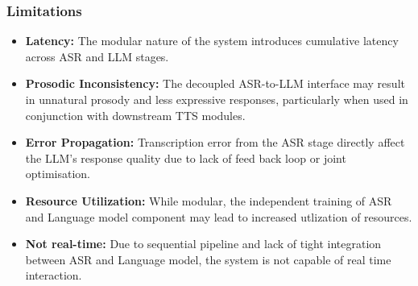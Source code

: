     \subsubsection{Limitations}
    \begin{itemize}
        \item \textbf{Latency: } The modular nature of the system introduces cumulative latency across ASR and LLM stages.
        \item \textbf{Prosodic Inconsistency: } The decoupled ASR-to-LLM interface may result in unnatural prosody and less expressive responses, particularly when used in conjunction with downstream TTS modules.
        \item \textbf{Error Propagation: } Transcription error from the ASR stage directly affect the LLM's response quality due to lack of feed back loop or joint optimisation.
        \item \textbf{Resource Utilization: } While modular, the independent training of ASR and Language model component may lead to increased utlization of resources.
        \item \textbf{Not real-time: } Due to sequential pipeline and lack of tight integration between ASR and Language model, the system is not capable of real time interaction.
    \end{itemize}

\pagebreak
